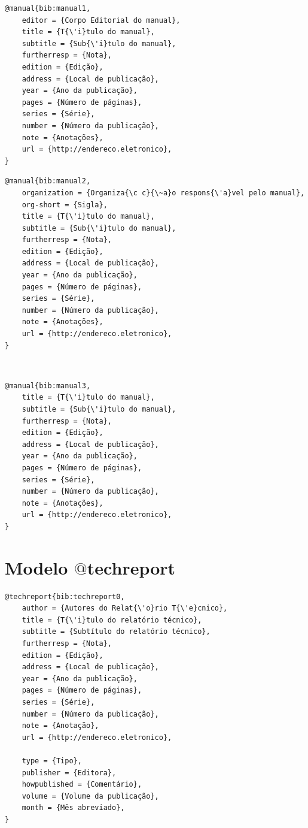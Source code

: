\documentclass[a4paper,12pt,oneside,onecolumn,final,fleqn]{repUERJ}
\begin{document}
\begin{verbatim}
@manual{bib:manual1,
    editor = {Corpo Editorial do manual},
    title = {T{\'i}tulo do manual},
    subtitle = {Sub{\'i}tulo do manual},
    furtherresp = {Nota},
    edition = {Edição},
    address = {Local de publicação},
    year = {Ano da publicação},
    pages = {Número de páginas},
    series = {Série},
    number = {Número da publicação},
    note = {Anotações},
    url = {http://endereco.eletronico},
}
\end{verbatim}

\noindent{}

\begin{verbatim}
@manual{bib:manual2,
    organization = {Organiza{\c c}{\~a}o respons{\'a}vel pelo manual},
    org-short = {Sigla},
    title = {T{\'i}tulo do manual},
    subtitle = {Sub{\'i}tulo do manual},
    furtherresp = {Nota},
    edition = {Edição},
    address = {Local de publicação},
    year = {Ano da publicação},
    pages = {Número de páginas},
    series = {Série},
    number = {Número da publicação},
    note = {Anotações},
    url = {http://endereco.eletronico},
}
\end{verbatim}

\noindent{}\\

\begin{verbatim}
@manual{bib:manual3,
    title = {T{\'i}tulo do manual},
    subtitle = {Sub{\'i}tulo do manual},
    furtherresp = {Nota},
    edition = {Edição},
    address = {Local de publicação},
    year = {Ano da publicação},
    pages = {Número de páginas},
    series = {Série},
    number = {Número da publicação},
    note = {Anotações},
    url = {http://endereco.eletronico},
}
\end{verbatim}

\section{Modelo $@$techreport}

\noindent{}

\begin{verbatim}
@techreport{bib:techreport0,
    author = {Autores do Relat{\'o}rio T{\'e}cnico},
    title = {T{\'i}tulo do relatório técnico},
    subtitle = {Subtítulo do relatório técnico},
    furtherresp = {Nota},
    edition = {Edição},
    address = {Local de publicação},
    year = {Ano da publicação},
    pages = {Número de páginas},
    series = {Série},
    number = {Número da publicação},
    note = {Anotação},
    url = {http://endereco.eletronico},

    type = {Tipo},
    publisher = {Editora},
    howpublished = {Comentário},
    volume = {Volume da publicação},
    month = {Mês abreviado},
}
\end{verbatim}
\end{document}
